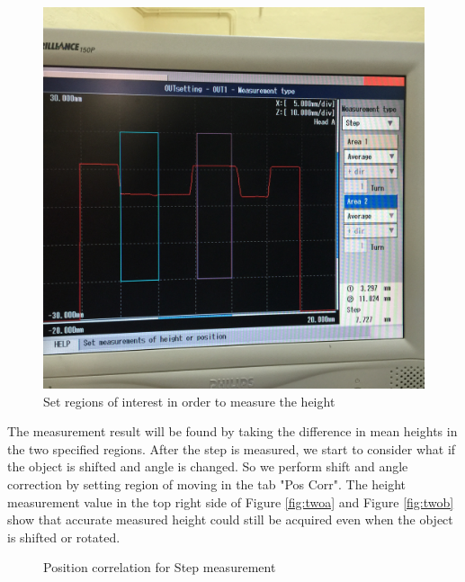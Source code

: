 \documentclass[english]{article}
\begin{document}
\begin{figure}[H]
	\centering
	\includegraphics[width=0.8\linewidth]{Lab6/Step1.JPG}
	\caption{Set regions of interest in order to measure the height}
	\label{fig:one}
\end{figure}
The measurement result will be found by taking the difference in mean heights in the two specified regions. After the step is measured, we start to consider what if the object is shifted and angle is changed. So we perform shift and angle correction by setting region of moving in the tab "Pos Corr". The height measurement value in the top right side of Figure \ref{fig:twoa} and Figure \ref{fig:twob} show that accurate measured height could still be acquired even when the object is shifted or rotated.\\

\begin{figure}[H]
	\centering
	\caption{Position correlation for Step measurement}
	\label{fig:two}
\end{figure}
\end{document}

